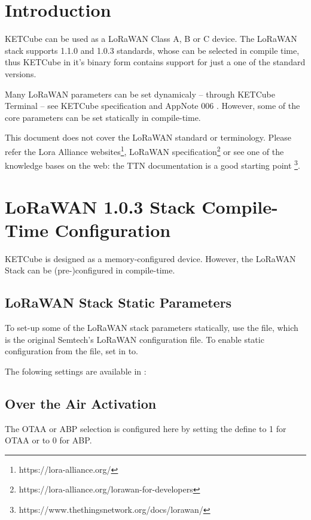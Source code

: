 \clearpage 
{} 
\pagestyle{headings} 

\clearpage
\clearpage
\section{Introduction}
  KETCube can be used as a LoRaWAN Class A, B or C device. The LoRaWAN stack supports 1.1.0 and 1.0.3 standards, whose can be selected in compile time, thus KETCube in it's binary form contains support for just a one of the standard versions.
  
  Many LoRaWAN parameters can be set dynamicaly -- through KETCube Terminal -- see KETCube specification \cite{ZCU:KETCube:05-2018} and AppNote 006 \cite{ZCU:KETCubeAppNote006:09-2019}. However, some of the core parameters can be set statically in compile-time.

  This document does not cover the LoRaWAN standard or terminology. Please refer the Lora Alliance websites\footnote{https://lora-alliance.org/}, LoRaWAN specification\footnote{https://lora-alliance.org/lorawan-for-developers} or see one of the knowledge bases on the web: the TTN documentation is a good starting point \footnote{https://www.thethingsnetwork.org/docs/lorawan/}.
  
\clearpage


\section{LoRaWAN 1.0.3 Stack Compile-Time Configuration}

KETCube is designed as a memory-configured device. However, the LoRaWAN Stack can be (pre-)configured in compile-time. 

\subsection{LoRaWAN Stack Static Parameters}
To set-up some of the LoRaWAN stack parameters statically, use the  file, which is the original Semtech's LoRaWAN configuration file. To enable static configuration from the  file, set  in  to\break {}.

The folowing settings are available in :

\subsection*{Over the Air Activation}
The OTAA or ABP selection is configured here by setting the \break{} define to 1 for OTAA or to 0 for ABP.

